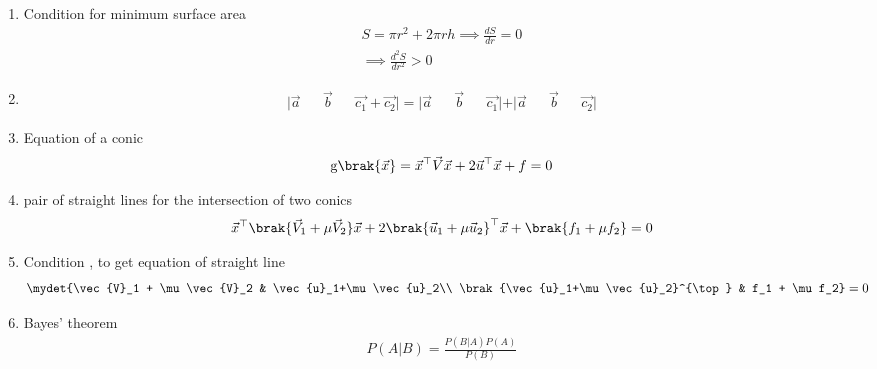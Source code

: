 \begin{enumerate}[label=\thesubsection.\arabic*, ref=\thesubsection.\theenumi]
 \item Condition for minimum surface area 
 \begin{align}
     S=\pi r^2+2\pi rh \implies \frac{dS}{dr}=0 \\ \implies \frac{d^2S}{dr^2}>0 \label{eq:ee26btech11222-prob 30}
 \end{align}
 \item
 \begin{align}
     \vert{}\vec{a}&&\vec{b}&& \vec{c_1}+\vec{c_2}\vert{}=|\vec{a}&&\vec{b} &&\vec{c_1}|+|\vec{a}&&\vec{b}&&\vec{c_2}|
 \end{align}
 \item Equation of a conic
 \begin{align}
 	\label{eq:conic_quad_form}
 	\text{g}\brak{\vec{x}} = \vec{x}^{\top}\vec{V}\vec{x}+2\vec{u}^{\top}\vec{x}+f=0
 \end{align}
 \item pair of straight lines for the intersection of two conics
 \begin{align}
 	\vec{x}^{\top}\brak{\vec{V}_1 + \mu\vec{V}_2}\vec{x}+2 \brak{\vec{u}_1+\mu \vec{u}_2}^{\top} \vec{x} 
 	+ \brak{f_1+\mu f_2}= 0
 	\label{eq:prob-33}
 \end{align}
 \item Condition , to get equation of straight line 
 \begin{align}
 	\label{eq:pair-mat-sing-conic-det}
 	\mydet{\vec{V}_1 + \mu\vec{V}_2 & \vec{u}_1+\mu \vec{u}_2\\ \brak{\vec{u}_1+\mu \vec{u}_2}^{\top} & f_1 + \mu f_2} &= 0
 \end{align}
 \item Bayes' theorem 
 \begin{align}
     P(A|B)=\frac{P(B|A)P(A)}{P(B)} \label{eq:ee26btech11222-prob 35}
 \end{align}
\end{enumerate}
